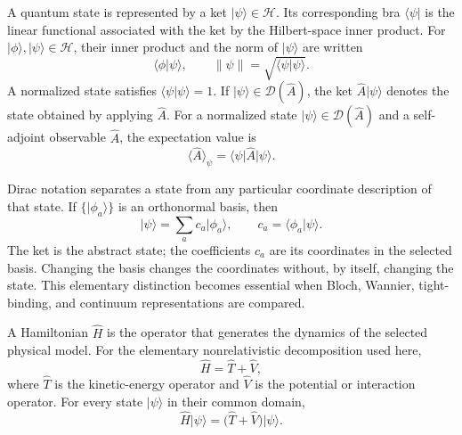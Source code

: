 \begin{definition}

A quantum state is represented by a ket
$\lvert\psi\rangle\in\mathcal H$. Its corresponding bra
$\langle\psi\rvert$ is the linear functional associated with the ket by the
Hilbert-space inner product. For
$\lvert\phi\rangle,\lvert\psi\rangle\in\mathcal H$, their inner product and the
norm of $\lvert\psi\rangle$ are written
\begin{equation}
    \langle\phi\vert\psi\rangle,
    \qquad
    \lVert\psi\rVert
    =
    \sqrt{\langle\psi\vert\psi\rangle}.
\end{equation}
A normalized state satisfies
$\langle\psi\vert\psi\rangle=1$. If
$\lvert\psi\rangle\in\mathcal D(\hat A)$, the ket
$\hat A\lvert\psi\rangle$ denotes the state obtained by applying $\hat A$.
For a normalized state
$\lvert\psi\rangle\in\mathcal D(\hat A)$ and a self-adjoint observable
$\hat A$, the expectation value is
\begin{equation}
    \langle\hat A\rangle_{\psi}
    =
    \langle\psi\rvert\hat A\lvert\psi\rangle.
\end{equation}
\end{definition}

Dirac notation separates a state from any particular coordinate description of
that state. If $\{\lvert\phi_a\rangle\}$ is an orthonormal basis, then
\begin{equation}
    \lvert\psi\rangle
    =
    \sum_a c_a\lvert\phi_a\rangle,
    \qquad
    c_a=\langle\phi_a\vert\psi\rangle.
\end{equation}
The ket is the abstract state; the coefficients $c_a$ are its coordinates in
the selected basis. Changing the basis changes the coordinates without, by
itself, changing the state. This elementary distinction becomes essential when
Bloch, Wannier, tight-binding, and continuum representations are compared.

\begin{definition}

A Hamiltonian $\hat H$ is the operator that generates the dynamics of the
selected physical model. For the elementary nonrelativistic decomposition used
here,
\begin{equation}
    \hat H=\hat T+\hat V,
\end{equation}
where $\hat T$ is the kinetic-energy operator and $\hat V$ is the potential or
interaction operator. For every state $\lvert\psi\rangle$ in their common
domain,
\begin{equation}
    \hat H\lvert\psi\rangle
    =
    \bigl(\hat T+\hat V\bigr)\lvert\psi\rangle.
\end{equation}
\end{definition}

